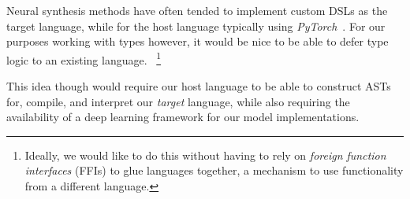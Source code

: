 \documentclass{article}
\begin{document}
Neural synthesis methods have often tended to implement custom DSLs as the target language,
while for the host language typically using \emph{PyTorch}~\citep{pytorch}.
For our purposes working with types however,
it would be nice to be able to defer type logic to an existing language.%
~\footnote{
    Ideally, we would like to do this without having to rely on
    \emph{foreign function interfaces} (FFIs)
    to glue languages together,
    a mechanism to use functionality from a different language.
}

This idea though would require our host language
to be able to construct ASTs for, compile,
and interpret our \emph{target} language,
while also requiring the availability of a
deep learning framework for our model implementations.

\end{document}
